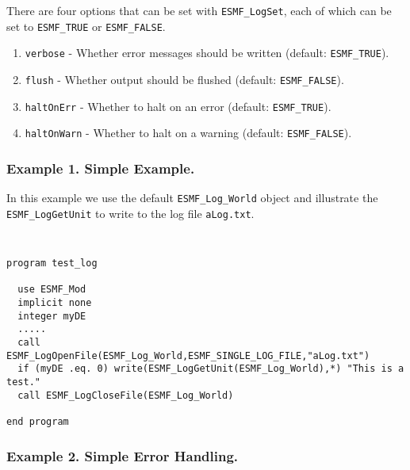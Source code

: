 %


There are four options that can be set with {\tt ESMF\_LogSet}, each of which 
can be set to {\tt ESMF\_TRUE} or {\tt ESMF\_FALSE}.
\begin{enumerate}
\item {\tt verbose} - Whether error messages should be written (default: {\tt ESMF\_TRUE}).
\item {\tt flush} - Whether output should be flushed (default:  {\tt ESMF\_FALSE}).
\item {\tt haltOnErr} - Whether to halt on an error (default:  {\tt ESMF\_TRUE}).
\item {\tt haltOnWarn} - Whether to halt on a warning (default:  {\tt ESMF\_FALSE}).
\end {enumerate}

\subsubsection{Example 1. Simple Example.}

In this example we use the default {\tt ESMF\_Log\_World} object and 
illustrate the {\tt ESMF\_LogGetUnit} to write to the log file 
{\tt aLog.txt}.

{\tt
\begin{verbatim}
program test_log

  use ESMF_Mod
  implicit none
  integer myDE
  .....
  call ESMF_LogOpenFile(ESMF_Log_World,ESMF_SINGLE_LOG_FILE,"aLog.txt")
  if (myDE .eq. 0) write(ESMF_LogGetUnit(ESMF_Log_World),*) "This is a test."
  call ESMF_LogCloseFile(ESMF_Log_World)

end program
\end{verbatim}
\tt}

\subsubsection{Example 2. Simple Error Handling.}

